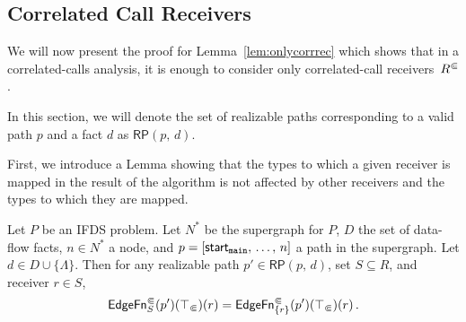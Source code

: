 \subsection*{Correlated Call Receivers}
We will now present the proof for Lemma~\ref{lem:onlycorrrec} which shows that in a correlated-calls analysis, it is enough to consider only correlated-call receivers~${R^\Subset}$.

In this section, we will denote the set of realizable paths corresponding to a valid path $p$ and a fact $d$ as $\textsf{RP}(p,\,d)$.

First, we introduce a Lemma showing that the types to which a given receiver is mapped in the result of the algorithm is not affected by other receivers and the types to which they are mapped.

\begin{lemma}\label{lem:recindepedgefn}
  Let $P$ be an IFDS problem. Let $N^*$ be the supergraph for $P$, $D$ the set of data-flow facts, $n\in N^*$ a node, and $p=[\textsf{start}_\texttt{main},\,\dots,\,n]$ a path in the supergraph. Let $d\in D\cup\{\Lambda\}$.
  Then for any realizable path $p'\in\textsf{RP}(p,\,d)$, set $S\subseteq R$, and receiver $r\in S$,
  \begin{equation}
    \textsf{EdgeFn}^\Subset_{S}(p')(\top_\Subset)(r)=
    \textsf{EdgeFn}^\Subset_{\{r\}}(p')(\top_\Subset)(r)\,.
  \end{equation}
\end{lemma}
